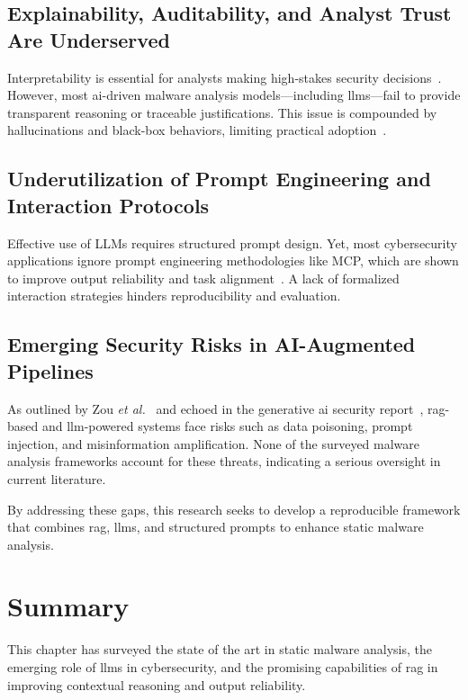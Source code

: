 \subsection{Explainability, Auditability, and Analyst Trust Are Underserved}\label{subsec:LiteratureGaps-ExplainabilityTrust}
Interpretability is essential for analysts making high-stakes security
decisions~\cite{wong2021practice}. However, most \gls{ai}-driven malware analysis models—including
\glspl{llm}—fail to provide transparent reasoning or traceable justifications. This issue is
compounded by hallucinations and black-box behaviors, limiting practical
adoption~\cite{metta2024generativeai, sahoo2024systematic}.

\subsection{Underutilization of Prompt Engineering and Interaction Protocols}\label{subsec:LiteratureGaps-PromptEngineering}
Effective use of \gls{LLMs} requires structured prompt design. Yet, most cybersecurity applications
ignore prompt engineering methodologies like MCP, which are shown to improve output reliability and
task alignment~\cite{sahoo2024systematic}. A lack of formalized interaction strategies hinders
reproducibility and evaluation.

\subsection{Emerging Security Risks in AI-Augmented Pipelines}\label{subsec:LiteratureGaps-SecurityRisks}
As outlined by Zou \emph{et al.}~\cite{zou2024poisonedrag} and echoed in the generative \gls{ai}
security report~\cite{metta2024generativeai}, \gls{rag}-based and \gls{llm}-powered systems face
risks such as data poisoning, prompt injection, and misinformation amplification. None of the
surveyed malware analysis frameworks account for these threats, indicating a serious oversight in
current literature.

By addressing these gaps, this research seeks to develop a reproducible framework that combines
\gls{rag}, \glspl{llm}, and structured prompts to enhance static malware analysis.

\section{Summary}\label{sec:LiteratureSummary}
This chapter has surveyed the state of the art in static malware analysis, the emerging role of
\glspl{llm} in cybersecurity, and the promising capabilities of \gls{rag} in improving contextual
reasoning and output reliability.

